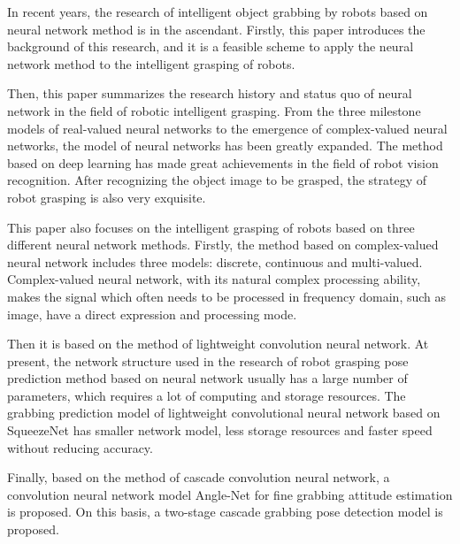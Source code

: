 \documentclass{yangthesis}
\begin{document}
\begin{abstracten}

In recent years, the research of intelligent object grabbing by robots based on neural network method is in the ascendant. Firstly, this paper introduces the background of this research, and it is a feasible scheme to apply the neural network method to the intelligent grasping of robots. 

Then, this paper summarizes the research history and status quo of neural network in the field of robotic intelligent grasping. From the three milestone models of real-valued neural networks to the emergence of complex-valued neural networks, the model of neural networks has been greatly expanded. The method based on deep learning has made great achievements in the field of robot vision recognition. After recognizing the object image to be grasped, the strategy of robot grasping is also very exquisite. 

This paper also focuses on the intelligent grasping of robots based on three different neural network methods. Firstly, the method based on complex-valued neural network includes three models: discrete, continuous and multi-valued. Complex-valued neural network, with its natural complex processing ability, makes the signal which often needs to be processed in frequency domain, such as image, have a direct expression and processing mode. 

Then it is based on the method of lightweight convolution neural network. At present, the network structure used in the research of robot grasping pose prediction method based on neural network usually has a large number of parameters, which requires a lot of computing and storage resources. The grabbing prediction model of lightweight convolutional neural network based on SqueezeNet has smaller network model, less storage resources and faster speed without reducing accuracy. 

Finally, based on the method of cascade convolution neural network, a convolution neural network model Angle-Net for fine grabbing attitude estimation is proposed. On this basis, a two-stage cascade grabbing pose detection model is proposed.

\end{abstracten}

\tableofcontents

\clearpage
\end{document}
